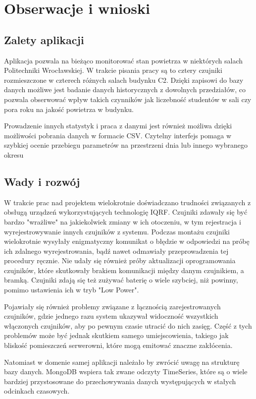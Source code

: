 \section{Obserwacje i wnioski}

\subsection{Zalety aplikacji}

Aplikacja pozwala na bieżąco monitorować stan powietrza w niektórych salach Politechniki Wrocławskiej. W trakcie pisania pracy są to
cztery czujniki rozmieszczone w czterech różnych salach budynku C2. Dzięki zapisowi do bazy danych możliwe jest badanie danych historycznych z dowolnych
przedziałów, co pozwala obserwować wpływ takich czynników jak liczebność studentów w sali czy pora roku na jakość powietrza w budynku.

Prowadzenie innych statystyk i praca z danymi jest również możliwa dzięki możliwości pobrania danych w formacie CSV. Czytelny interfejs pomaga w 
szybkiej ocenie przebiegu parametrów na przestrzeni dnia lub innego wybranego okresu

\subsection{Wady i rozwój}

W trakcie prac nad projektem wielokrotnie doświadczano trudności związanych z obsługą urządzeń wykorzystujących technologię IQRF. Czujniki zdawały się
być bardzo "wrażliwe" na jakiekolwiek zmiany w ich otoczeniu, w tym rejestracja i wyrejestrowywanie innych czujników z systemu. Podczas montażu
czujniki wielokrotnie wysyłały enigmatyczny komunikat o błędzie w odpowiedzi na próbę ich zdalnego wyrejestrowania, bądź nawet odmawiały
przeprowadzenia tej procedury ręcznie. 
Nie udały się również próby aktualizacji oprogramowania czujników, które skutkowały brakiem komunikacji między danym czujnikiem, a bramką. 
Czujniki zdają się też zużywać baterię o wiele szybciej, niż powinny, pomimo ustawienia ich w tryb "Low Power".

Pojawiały się również problemy związane z łącznością zarejestrowanych czujników, gdzie jednego razu system ukazywał widoczność wszystkich włączonych
czujników, aby po pewnym czasie utracić do nich zasięg. Część z tych problemów może być jednak skutkiem samego umiejscowienia, takiego jak bliskość 
pomieszczeń serwerowni, które mogą emitować znaczne zakłócenia.

Natomiast w domenie samej aplikacji należało by zwrócić uwagę na strukturę bazy danych. MongoDB wspiera tak zwane odczyty TimeSeries, które są o wiele
bardziej przystosowane do przechowywania danych występujących w stałych odcinkach czasowych.

